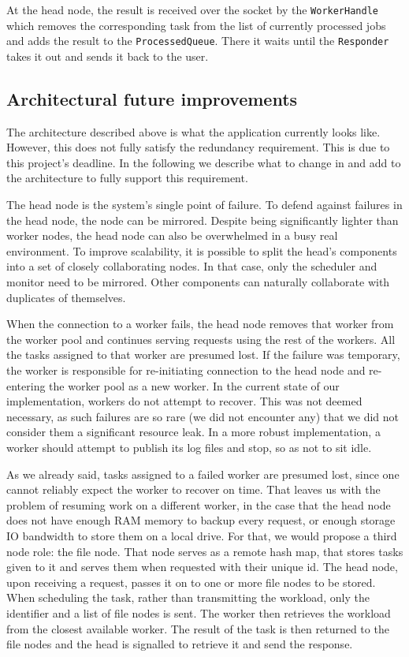 \documentclass{stylesheet}
\begin{document}
At the head node, the result is received over the socket  by the \texttt{WorkerHandle} which removes the corresponding task from the list of currently processed jobs and adds the result to the \texttt{ProcessedQueue}. There it waits until the \texttt{Responder} takes it out and sends it back to the user.

\subsection{Architectural future improvements}
\label{ArchitecturalFutureImprovements}
The architecture described above is what the application currently looks like. However, this does not fully satisfy the redundancy requirement. This is due to this project's deadline. In the following we describe what to change in and add to the architecture to fully support this requirement.

The head node is the system's single point of failure. To defend against failures in the head node, the node can be mirrored. Despite being significantly lighter than worker nodes, the head node can also be overwhelmed in a busy real environment. To improve scalability, it is possible to split the head's components into a set of closely collaborating nodes. In that case, only the scheduler and monitor need to be mirrored. Other components can naturally collaborate with duplicates of themselves.

When the connection to a worker fails, the head node removes that worker from the worker pool and continues serving requests using the rest of the workers. All the tasks assigned to that worker are presumed lost. If the failure was temporary, the worker is responsible for re-initiating connection to the head node and re-entering the worker pool as a new worker. In the current state of our implementation, workers do not attempt to recover. This was not deemed necessary, as such failures are so rare (we did not encounter any) that we did not consider them a significant resource leak. In a more robust implementation, a worker should attempt to publish its log files and stop, so as not to sit idle.

As we already said, tasks assigned to a failed worker are presumed lost, since one cannot reliably expect the worker to recover on time. That leaves us with the problem of resuming work on a different worker, in the case that the head node does not have enough RAM memory to backup every request, or enough storage IO bandwidth to store them on a local drive. For that, we would propose a third node role: the file node. That node serves as a remote hash map, that stores tasks given to it and serves them when requested with their unique id. The head node, upon receiving a request, passes it on to one or more file nodes to be stored. When scheduling the task, rather than transmitting the workload, only the identifier and a list of file nodes is sent. The worker then retrieves the workload from the closest available worker. The result of the task is then returned to the file nodes and the head is signalled to retrieve it and send the response.
\end{document}
